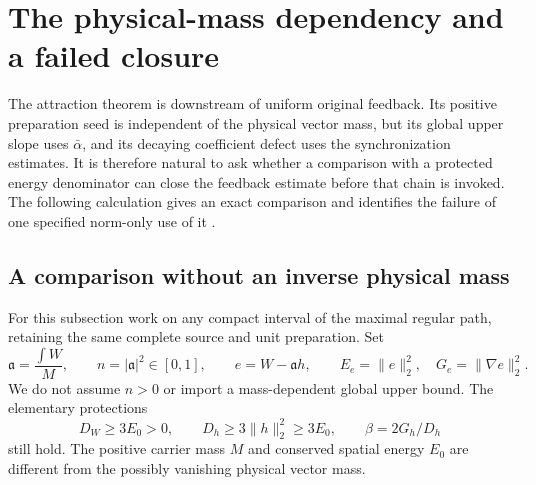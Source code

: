 \documentclass[11pt]{article}
\numberwithin{equation}{section}
\begin{document}
\section{The physical-mass dependency and a failed closure}
\label{sec:massdependency}

The attraction theorem is downstream of uniform original feedback.
Its positive preparation seed is independent of the physical vector
mass, but its global upper slope uses $\bar\alpha$, and its decaying
coefficient defect uses the synchronization estimates. It is therefore
natural to ask whether a comparison with a protected energy denominator
can close the feedback estimate before that chain is invoked. The
following calculation gives an exact comparison and identifies the
failure of one specified norm-only use of it \cite{MassFreeClosureNote}.

\subsection{A comparison without an inverse physical mass}

For this subsection work on any compact interval of the maximal regular
path, retaining the same complete source and unit preparation. Set
\[
 \mathfrak a=\frac{\int W}{M},\qquad
 n=|\mathfrak a|^2\in[0,1],\qquad e=W-\mathfrak ah,
 \qquad E_e=\|e\|_2^2,\quad G_e=\|\nabla e\|_2^2.
\]
We do not assume $n>0$ or import a mass-dependent global upper bound.
The elementary protections
\[
 D_W\ge3E_0>0,\qquad D_h\ge3\|h\|_2^2\ge3E_0,
 \qquad \beta=2G_h/D_h
\]
still hold. The positive carrier mass $M$ and conserved spatial energy
$E_0$ are different from the possibly vanishing physical vector mass.
\end{document}
